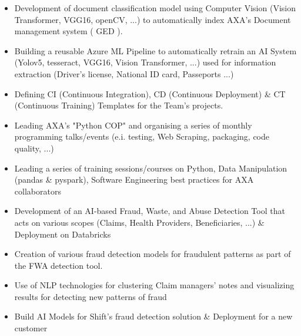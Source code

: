 \documentclass[10pt,letter,ragged2e,withhyper]{altacv}
\renewcommand{\divider}{\textcolor{body!30}{\hdashrule{\linewidth}{0.6pt}{0.5ex}}\medskip}
\begin{document}
\begin{paracol}{2}



\begin{itemize}
  \item Development of document classification model using Computer Vision (Vision Transformer, VGG16, openCV, ...) to automatically index AXA's Document management system ( GED ).
  \item Building a reusable Azure ML Pipeline to automatically retrain an AI System (Yolov5, tesseract, VGG16, Vision Transformer, ...) used for information extraction (Driver's license, National ID card, Passeports ...)
  \item Defining CI (Continuous Integration), CD (Continuous Deployment) \& CT (Continuous Training) Templates for the Team's projects.
  \item Leading AXA's "Python COP" and organising a series of monthly programming talks/events (e.i. testing, Web Scraping, packaging, code quality, ...)
  \item Leading a series of training sessions/courses on Python, Data Manipulation (pandas \& pyspark), Software Engineering best practices for AXA collaborators
\end{itemize}

\divider
{}

\begin{itemize}
  \item Development of an AI-based Fraud, Waste, and Abuse Detection Tool that acts on various scopes (Claims, Health Providers, Beneficiaries, ...) \& Deployment on Databricks
  \item Creation of various fraud detection models for fraudulent patterns as part of the FWA detection tool.
\end{itemize}

\divider
{}

\begin{itemize}
  \item Use of NLP technologies for clustering Claim managers' notes and visualizing results for detecting new patterns of fraud
  \item Build AI Models for Shift's fraud detection solution \& Deployment for a new customer
\end{itemize}




\end{paracol}
\end{document}
